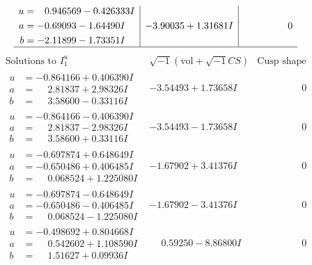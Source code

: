 \documentclass[1p]{elsarticle_modified}
\theoremstyle{definition}
\newcommand{\I}{\sqrt{-1}}
\begin{document}
$$\begin{array}{c|c|c}
\begin{aligned}
u &= \phantom{-}0.946569 - 0.426333 I \\
a &= -0.69093 - 1.64490 I \\
b &= -2.11899 - 1.73351 I\end{aligned}
 & -3.90035 + 1.31681 I & \phantom{-0.000000 } 0\\
 \hline 
 \end{array}$$\newpage$$\begin{array}{c|c|c}  
\text{Solutions to }I^u_{1}& \I (\text{vol} + \sqrt{-1}CS) & \text{Cusp shape}\\
 \hline 
\begin{aligned}
u &= -0.864166 + 0.406390 I \\
a &= \phantom{-}2.81837 + 2.98326 I \\
b &= \phantom{-}3.58600 - 0.33116 I\end{aligned}
 & -3.54493 + 1.73658 I & \phantom{-0.000000 } 0 \\ \hline\begin{aligned}
u &= -0.864166 - 0.406390 I \\
a &= \phantom{-}2.81837 - 2.98326 I \\
b &= \phantom{-}3.58600 + 0.33116 I\end{aligned}
 & -3.54493 - 1.73658 I & \phantom{-0.000000 } 0 \\ \hline\begin{aligned}
u &= -0.697874 + 0.648649 I \\
a &= -0.650486 + 0.406485 I \\
b &= \phantom{-}0.068524 + 1.225080 I\end{aligned}
 & -1.67902 + 3.41376 I & \phantom{-0.000000 } 0 \\ \hline\begin{aligned}
u &= -0.697874 - 0.648649 I \\
a &= -0.650486 - 0.406485 I \\
b &= \phantom{-}0.068524 - 1.225080 I\end{aligned}
 & -1.67902 - 3.41376 I & \phantom{-0.000000 } 0 \\ \hline\begin{aligned}
u &= -0.498692 + 0.804668 I \\
a &= \phantom{-}0.542602 + 1.108590 I \\
b &= \phantom{-}1.51627 + 0.09936 I\end{aligned}
 & \phantom{-}0.59250 - 8.86800 I & \phantom{-0.000000 } 0 \\ \hline\begin{aligned}

\end{aligned}
\end{array}$$
\end{document}
